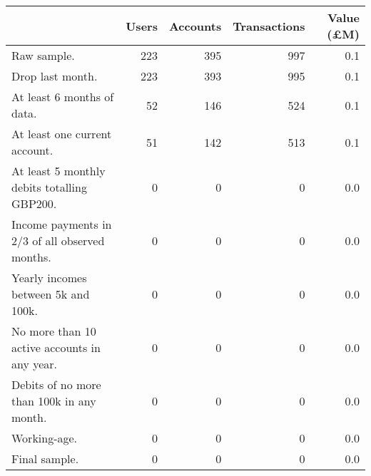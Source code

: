 \begin{tabular}{lrrrr}
\toprule
                                               & Users & Accounts & Transactions & Value (\pounds M) \\
\midrule
                                   Raw sample. &   223 &      395 &          997 &               0.1 \\
                              Drop last month. &   223 &      393 &          995 &               0.1 \\
                    At least 6 months of data. &    52 &      146 &          524 &               0.1 \\
                 At least one current account. &    51 &      142 &          513 &               0.1 \\
   At least 5 monthly debits totalling GBP200. &     0 &        0 &            0 &               0.0 \\
Income payments in 2/3 of all observed months. &     0 &        0 &            0 &               0.0 \\
           Yearly incomes between 5k and 100k. &     0 &        0 &            0 &               0.0 \\
  No more than 10 active accounts in any year. &     0 &        0 &            0 &               0.0 \\
     Debits of no more than 100k in any month. &     0 &        0 &            0 &               0.0 \\
                                  Working-age. &     0 &        0 &            0 &               0.0 \\
                                 Final sample. &     0 &        0 &            0 &               0.0 \\
\bottomrule
\end{tabular}
